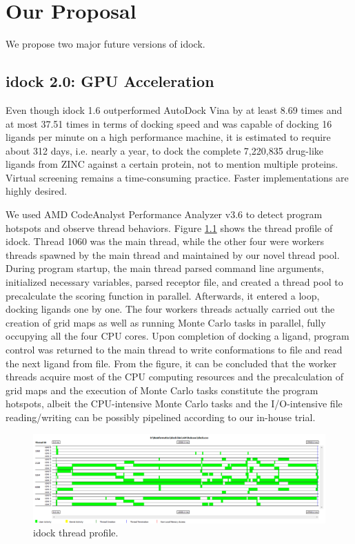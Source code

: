 \chapter{Our Proposal}

We propose two major future versions of idock.

\section{idock 2.0: GPU Acceleration}

Even though idock 1.6 outperformed AutoDock Vina \citep{595} by at least 8.69 times and at most 37.51 times in terms of docking speed and was capable of docking 16 ligands per minute on a high performance machine, it is estimated to require about 312 days, i.e. nearly a year, to dock the complete 7,220,835 drug-like ligands from ZINC against a certain protein, not to mention multiple proteins. Virtual screening remains a time-consuming practice. Faster implementations are highly desired.

We used AMD CodeAnalyst Performance Analyzer v3.6 to detect program hotspots and observe thread behaviors. Figure \ref{idock:ThreadProfile} shows the thread profile of idock. Thread 1060 was the main thread, while the other four were workers threads spawned by the main thread and maintained by our novel thread pool. During program startup, the main thread parsed command line arguments, initialized necessary variables, parsed receptor file, and created a thread pool to precalculate the scoring function in parallel. Afterwards, it entered a loop, docking ligands one by one. The four workers threads actually carried out the creation of grid maps as well as running Monte Carlo tasks in parallel, fully occupying all the four CPU cores. Upon completion of docking a ligand, program control was returned to the main thread to write conformations to file and read the next ligand from file. From the figure, it can be concluded that the worker threads acquire most of the CPU computing resources and the precalculation of grid maps and the execution of Monte Carlo tasks constitute the program hotspots, albeit the CPU-intensive Monte Carlo tasks and the I/O-intensive file reading/writing can be possibly pipelined according to our in-house trial.

\begin{figure}
\centering
\includegraphics[width=\textwidth]{idock/ThreadProfile.png}
\caption{idock thread profile.}
\label{idock:ThreadProfile}
\end{figure}

